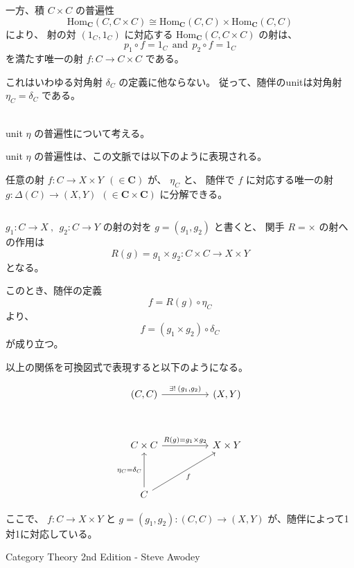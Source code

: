 \documentclass[uplatex,a4j,12pt,dvipdfmx]{jsarticle}
\begin{document}
一方、積 $C \times C$ の普遍性
$$
	\mathrm{Hom}_{\mathbf{C}}(C, C \times C)
	\cong
	\mathrm{Hom}_{\mathbf{C}}(C, C)
	\times
	\mathrm{Hom}_{\mathbf{C}}(C, C)
$$
により、
射の対
$(1_{C}, 1_{C})$
に対応する
$\mathrm{Hom}_{\mathbf{C}}(C, C \times C)$
の射は、
$$
	p_{1} \circ f = 1_{C} \ \ \text{and} \ \ p_{2} \circ f = 1_{C}
$$
を満たす唯一の射 $f: C \to C \times C$ である。

これはいわゆる対角射 $\delta_{C}$ の定義に他ならない。
従って、随伴のunitは対角射 $\eta_{C} = \delta_{C}$ である。

\ \\

unit $\eta$ の普遍性について考える。

unit $\eta$ の普遍性は、この文脈では以下のように表現される。

任意の射
$f: C \to X \times Y \ \ (\in \mathbf{C})$
が、
$\eta_{C}$ と、
随伴で $f$ に対応する唯一の射
$g: \Delta(C) \to (X,Y) \ \ (\in \mathbf{C} \times \mathbf{C})$
に分解できる。


${}$

$g_{1}: C \to X \ , \ \ g_{2}: C \to Y$
の射の対を
$g=(g_{1},g_{2})$
と書くと、
関手 $R=\times$ の射への作用は
$$
	R(g) = g_{1} \times g_{2} : C \times C \to X \times Y
$$
となる。

このとき、随伴の定義
$$
	f =  R(g) \circ \eta_{C}
$$
より、
$$
	f = (g_{1} \times g_{2}) \circ \delta_{C}
$$
が成り立つ。

以上の関係を可換図式で表現すると以下のようになる。

\[
	\begin{tikzcd}
		{(C,C)} \arrow[rr, "{\exists ! \ \! (g_{1},g_{2})}"] &  & {(X,Y)}    \\
		&  &            \\
		C \times C \arrow[rr, "R(g)=g_{1} \times g_{2}"]          &  & X \times Y \\
		&  &            \\
		C \arrow[rruu, "f"'] \arrow[uu, "\eta_{C}=\delta_{C}"]          &  &
	\end{tikzcd}
\]

ここで、
$f : C \to X \times Y$
と
$g=(g_{1},g_{2}): (C,C) \to (X,Y)$
が、随伴によって1対1に対応している。



\begin{thebibliography}{9}
	Category Theory 2nd Edition - Steve Awodey
\end{thebibliography}
\end{document}
